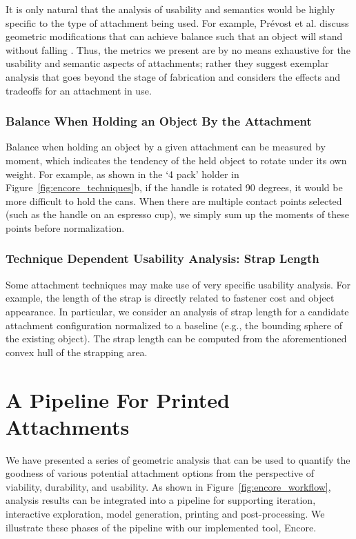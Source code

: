It is only natural that the analysis of usability and semantics would be highly specific to the type of attachment being used. For example, Pr\'evost et al. discuss geometric modifications that can achieve balance such that an object will stand without falling \cite{prevost2013make}. Thus, the metrics we present are by no means exhaustive for the usability and semantic aspects of attachments; rather they suggest exemplar analysis that goes beyond the stage of fabrication and considers the effects and tradeoffs for an attachment in use.

\subsubsection{Balance When Holding an Object By the Attachment}
Balance when holding an object by a given attachment can be measured by moment, which indicates the tendency of the held object to rotate under its own weight. For example, as shown in the ‘4 pack' holder in Figure~\ref{fig:encore_techniques}b, if the handle is rotated 90 degrees, it would be more difficult to hold the cans. When there are multiple contact points selected (such as the handle on an espresso cup), we simply sum up the moments of these points before normalization.

\subsubsection{Technique Dependent Usability Analysis: Strap Length}
Some attachment techniques may make use of very specific usability analysis. For example, the length of the strap is directly related to fastener cost and object appearance. In particular, we consider an analysis of strap length for a candidate attachment configuration normalized to a baseline (e.g., the bounding sphere of the existing object). The strap length can be computed from the aforementioned convex hull of the strapping area.

\section{A Pipeline For Printed Attachments}
We have presented a series of geometric analysis that can be used to quantify the goodness of various potential attachment options from the perspective of viability, durability, and usability. As shown in Figure~\ref{fig:encore_workflow}, analysis results can be integrated into a pipeline for supporting iteration, interactive exploration, model generation, printing and post-processing. We illustrate these phases of the pipeline with our implemented tool, Encore.

